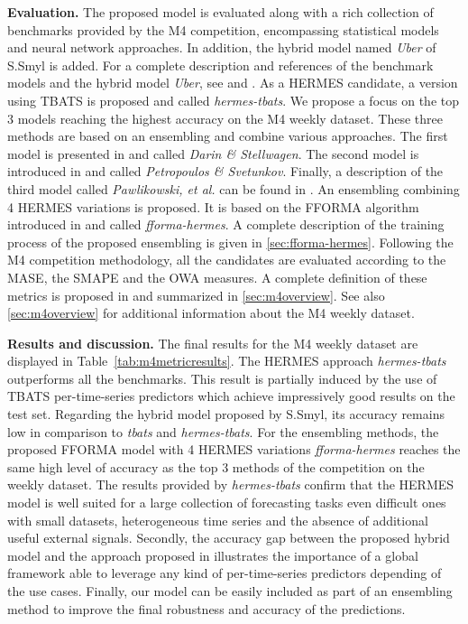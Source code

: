 \documentclass[10pt]{article} %
\begin{document}
\textbf{Evaluation. } The proposed model is evaluated along with a rich collection of benchmarks provided by the M4 competition, encompassing statistical models and neural network approaches. In addition, the hybrid model named \textit{Uber} of S.Smyl is added. For a complete description and references of the benchmark models and the hybrid model \textit{Uber}, see \citet{makridakis2020} and \citet{smyl2020}. As a HERMES candidate, a version using TBATS is proposed and called \textit{hermes-tbats}. We propose a focus on the top 3 models reaching the highest accuracy on the M4 weekly dataset. These three methods are based on an ensembling and combine various approaches.
The first model is presented in \citet{darin2020} and called \textit{Darin \& Stellwagen}. The second model is introduced in \citet{petropoulos2020} and called \textit{Petropoulos \& Svetunkov}. Finally, a description of the third model  called \textit{Pawlikowski, et al.} can be found in \citet{pawlikowski2020}. An ensembling combining 4 HERMES variations is proposed. It is based on the FFORMA algorithm introduced in \citet{montero2020} and called \textit{fforma-hermes}. A complete description of the training process of the proposed ensembling is given in \ref{sec:fforma-hermes}. Following the M4 competition methodology, all the candidates are evaluated according to the MASE, the SMAPE and the OWA measures. A complete definition of these metrics is proposed in \citet{makridakis2020} and summarized in \ref{sec:m4overview}. See also \ref{sec:m4overview} for additional information about the M4 weekly dataset.

\textbf{Results and discussion. } The final results for the M4 weekly dataset are displayed in Table~\ref{tab:m4metricresults}. The HERMES approach \textit{hermes-tbats} outperforms all the benchmarks. This result is partially induced by the use of TBATS per-time-series predictors which achieve impressively good results on the test set. Regarding the hybrid model proposed by S.Smyl, its accuracy remains low in comparison to \textit{tbats} and  \textit{hermes-tbats}. For the ensembling methods, the proposed FFORMA model with 4 HERMES variations \textit{fforma-hermes} reaches the same high level of accuracy as the top 3 methods of the competition on the weekly dataset.
The results provided by \textit{hermes-tbats} confirm that the HERMES model is well suited for a large collection of forecasting tasks even difficult ones with small datasets, heterogeneous time series and the absence of  additional useful external signals. Secondly, the accuracy gap between the proposed hybrid model and the approach proposed in \citet{smyl2020} illustrates the importance of a global framework able to leverage any kind of per-time-series predictors depending of the use cases. Finally, our model can be easily included as part of an ensembling method to improve the final robustness and accuracy of the predictions.
\end{document}
